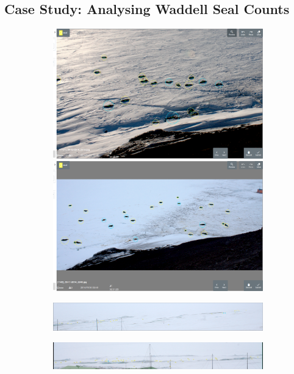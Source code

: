 \subsection{Case Study: Analysing Waddell Seal Counts}



\begin{figure}[h!]
\centering
\begin{subfigure}[t]{1.0\linewidth}
  \includegraphics[width=0.475\linewidth]{figures/annotation/screenshots/seals_small2.png}
  \hfill
  \includegraphics[width=0.475\linewidth]{figures/annotation/screenshots/seals_small.png}
  \caption{}
\end{subfigure}

\begin{subfigure}[t]{1.0\linewidth}
  \includegraphics[width=1.0\linewidth]{figures/annotation/screenshots/cam_c.png}
\end{subfigure}

\begin{subfigure}[t]{1.0\linewidth}

  \includegraphics[width=1.0\linewidth]{figures/annotation/screenshots/cam_b.png}
  \caption{}
\end{subfigure}



\caption{ }
\label {fig:weddell_images}
\end{figure}



